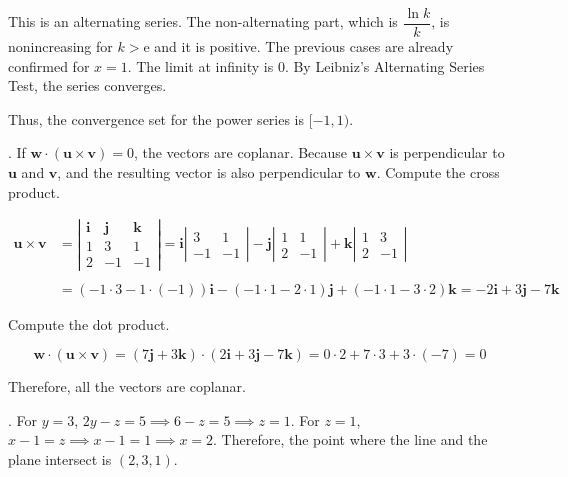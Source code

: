 \documentclass{article}
\begin{document}
\hfill

\noindent This is an alternating series. The non-alternating part, which is $\dfrac{\ln k}k$, is nonincreasing for $k>\mathrm{e}$ and it is positive. The previous cases are already confirmed for $x=1$. The limit at infinity is $0$. By Leibniz's Alternating Series Test, the series converges.

\hfill

\noindent Thus, the convergence set for the power series is $\boxed{[-1,1)}$.

\hfill

. If $\mathbf{w}\cdot(\mathbf{u}\times\mathbf{v})=0$, the vectors are coplanar. Because $\mathbf{u}\times\mathbf{v}$ is perpendicular to $\mathbf u$ and $\mathbf v$, and the resulting vector is also perpendicular to $\mathbf w$. Compute the cross product.

\begin{align*}\mathbf{u}\times\mathbf{v}&=\left|\begin{array}{ccc}
\mathbf{i}&\mathbf{j}&\mathbf{k}\\
1&3&1\\
2&-1&-1
\end{array}\right|=\mathbf{i}\left|\begin{array}{cc}
3&1\\-1&-1
\end{array}\right|-\mathbf{j}\left|\begin{array}{cc}
1&1\\2&-1
\end{array}\right|+\mathbf{k}\left|\begin{array}{cc}
1&3\\2&-1
\end{array}\right|\\\\&=(-1\cdot3-1\cdot(-1))\mathbf{i}-(-1\cdot1-2\cdot1)\mathbf{j}+(-1\cdot1-3\cdot2)\mathbf{k}=-2\mathbf i+3\mathbf j-7\mathbf k\end{align*}

\hfill

\noindent Compute the dot product.

\[\mathbf w\cdot(\mathbf u\times\mathbf v)=(7\mathbf j+3\mathbf k)\cdot(2\mathbf i+3\mathbf j-7\mathbf k)=0\cdot2+7\cdot3+3\cdot(-7)=0\]

\hfill

\noindent Therefore, all the vectors are coplanar.

\hfill

. For $y=3$, $2y-z=5\implies6-z=5\implies z=1$. For $z=1$, $x-1=z\implies x-1=1\implies x=2$. Therefore, the point where the line and the plane intersect is $\boxed{(2,3,1)}$.
\end{document}
